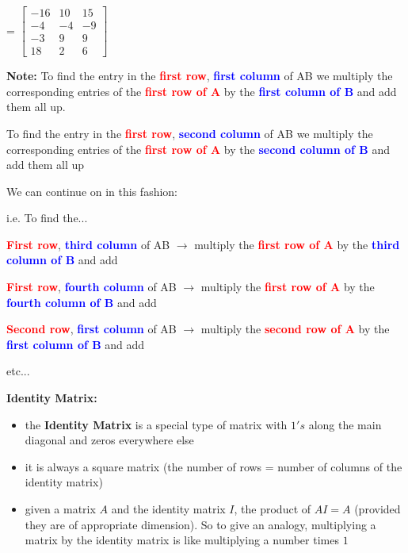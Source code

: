 \documentclass[12pt]{article}
\newenvironment{myindentpar}[1]%
     {\begin{list}{}%
             {\setlength{\leftmargin}{#1}}%
             \item[]%
     }
     {\end{list}}
\begin{document}
\begin{itemize}
\begin{myindentpar}{1cm}
\vspace{1cm}

\centerline{
= $\begin{bmatrix}                                        
       -16 & 10& 15           \\[1.5em]			
       -4& -4 & -9 \\[1.5em]       		
       -3 & 9 & 9   \\[1.5em]   
       18 & 2 & 6			
     \end{bmatrix}$
}
\end{myindentpar}

\textbf{Note:} To find the entry in the \textbf{\textcolor{red}{first row}}, \textbf{\textcolor{blue}{first column}} of AB we multiply the corresponding entries of the \textbf{\textcolor{red}{first row of A}} by the \textbf{\textcolor{blue}{first column of B}} and add them all up.

To find the entry in the \textbf{\textcolor{red}{first row}}, \textbf{\textcolor{blue}{second column}} of AB we multiply the corresponding entries of the \textbf{\textcolor{red}{first row of A}} by the \textbf{\textcolor{blue}{second column of B}} and add them all up

We can continue on in this fashion:

i.e. To find the...

\textbf{\textcolor{red}{First row}}, \textbf{\textcolor{blue}{third column}} of AB $\rightarrow$ multiply the \textbf{\textcolor{red}{first row of A}} by the \textbf{\textcolor{blue}{third column of B}} and add

\textbf{\textcolor{red}{First row}}, \textbf{\textcolor{blue}{fourth column}} of AB $\rightarrow$ multiply the \textbf{\textcolor{red}{first row of A}} by the \textbf{\textcolor{blue}{fourth column of B}} and add

\textbf{\textcolor{red}{Second row}}, \textbf{\textcolor{blue}{first column}} of AB $\rightarrow$ multiply the \textbf{\textcolor{red}{second row of A}} by the \textbf{\textcolor{blue}{first column of B}} and add

etc...

\end{itemize}

\textbf{Identity Matrix:}
\begin{itemize}
\item the \textbf{Identity Matrix} is a special type of matrix with $1's$ along the main diagonal and zeros everywhere else
\item it is always a square matrix (the number of rows = number of columns of the identity matrix)
\item given a matrix $A$ and the identity matrix $I$, the product of $AI = A$ (provided they are of appropriate dimension). So to give an analogy, multiplying a matrix by the identity matrix is like multiplying a number times $1$
\end{itemize}
\end{document}
